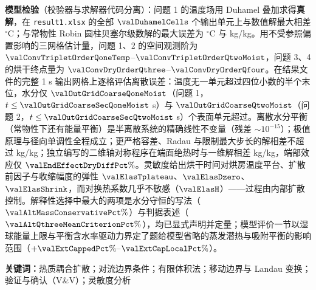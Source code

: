 \textbf{模型检验}（校验器与求解器代码分离）：问题 1 的温度场用 Duhamel 叠加求得\textbf{真解}，在 \nolinkurl{result1.xlsx} 的全部 $\valDuhamelCells$ 个输出单元上与数值解最大相差 \sci{\valDuhamelErrFull} $^\circ$C；与常物性 Robin 圆柱贝塞尔级数解的最大误差为 \sci{\valAnalyticErrTemp} $^\circ$C 与 \sci{\valAnalyticErrMoist} kg/kg。用不受参照偏置影响的三网格估计量，问题 1、2 的空间观测阶为 $\valConvTripletOrderQoneTemp$--$\valConvTripletOrderQtwoMoist$，问题 3、4 的烘干终点量为 $\valConvDryOrderQthree$--$\valConvDryOrderQfour$。在结果文件的完整 1 s 输出网格上逐格评估离散误差：温度无一单元超过四位小数的半个末位，水分仅 $\valOutGridCoarseQoneMoist$（问题 1，$t\le\valOutGridCoarseSecQoneMoist$ s）与 $\valOutGridCoarseQtwoMoist$（问题 2，$t\le\valOutGridCoarseSecQtwoMoist$ s）个表面单元超过。离散水分平衡（常物性下还有能量平衡）是半离散系统的精确线性不变量（残差 $\sim10^{-15}$）；极值原理与径向单调性全程成立；更严格容差、Radau 与限制最大步长的解相差不超过 \sci{\valTimeRadauDiffMoist} kg/kg；独立编写的二维轴对称程序在端面绝热时与一维解相差 \sci{\valCrossCheckDiffMoist} kg/kg，端部效应仅 $\valEndEffectDryDiffPct\%$。灵敏度给出烘干时间对烘房温度平台、扩散前因子与收缩幅度的弹性 $\valElasTplateau$、$\valElasDzero$、$\valElasShrink$，而对换热系数几乎不敏感（$\valElasH$）——过程由内部扩散控制。解释性选择中最大的两项是水分守恒的写法（$\valAltMassConservativePct\%$）与判据表述（$\valAltQthreeMeanCriterionPct\%$），均已显式声明并定量；模型评价一节以湿球能量上限与平衡含水率驱动力界定了题给模型省略的蒸发潜热与吸附平衡的影响范围（$+\valExtCappedPct\%$--$\valExtCapLocalPct\%$）。

\par\vspace{0.4em}
\noindent\textbf{关键词：}热质耦合扩散；对流边界条件；有限体积法；移动边界与 Landau 变换；验证与确认（V\&V）；灵敏度分析
